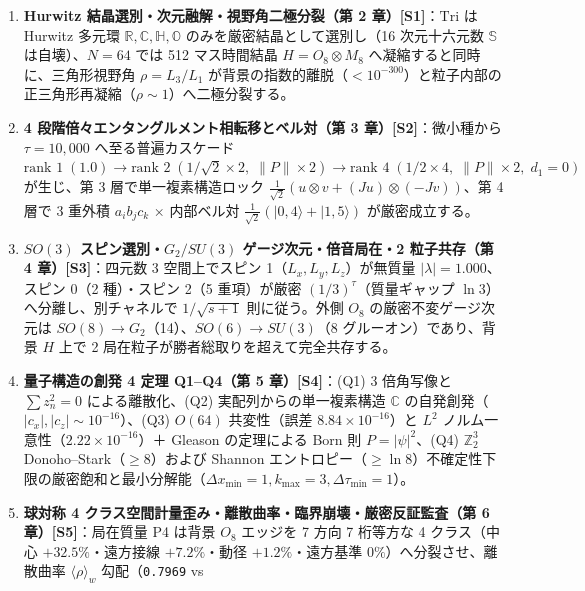 \documentclass[
  a4paper,
]{ltjsarticle}
\providecommand{\tightlist}{%
  \setlength{\itemsep}{0pt}\setlength{\parskip}{0pt}}
\begin{document}
\begin{enumerate}
\def\labelenumi{\arabic{enumi}.}
\tightlist
\item
  \textbf{Hurwitz 結晶選別・次元融解・視野角二極分裂（第 2
  章）{[}S1{]}}：\(\mathrm{Tri}\) は Hurwitz 多元環
  \(\mathbb{R}, \mathbb{C}, \mathbb{H}, \mathbb{O}\)
  のみを厳密結晶として選別し（16 次元十六元数 \(\mathbb{S}\)
  は自壊）、\(N = 64\) では 512 マス時間結晶 \(H = O_8 \otimes M_8\)
  へ凝縮すると同時に、三角形視野角 \(\rho = L_3/L_1\)
  が背景の指数的離脱（\(< 10^{-300}\)）と粒子内部の正三角形再凝縮（\(\rho \sim 1\)）へ二極分裂する。
\item
  \textbf{4 段階倍々エンタングルメント相転移とベル対（第 3
  章）{[}S2{]}}：微小種から \(\tau = 10{,}000\) へ至る普遍カスケード
  \(\text{rank } 1\;(1.0) \to \text{rank } 2\;(1/\sqrt{2}\times 2,\; \|P\|\times 2) \to \text{rank } 4\;(1/2\times 4,\; \|P\|\times 2,\; d_1=0)\)
  が生じ、第 3 層で単一複素構造ロック
  \(\frac{1}{\sqrt{2}}(u\otimes v + (Ju)\otimes(-Jv))\)、第 4 層で 3
  重外積 \(a_i b_j c_k\) × 内部ベル対
  \(\frac{1}{\sqrt{2}}(|0,4\rangle+|1,5\rangle)\) が厳密成立する。
\item
  \textbf{\(SO(3)\) スピン選別・\(G_2/SU(3)\) ゲージ次元・倍音局在・2
  粒子共存（第 4 章）{[}S3{]}}：四元数 3 空間上でスピン
  1（\(L_x,L_y,L_z\)）が無質量 \(|\lambda|=1.000\)、スピン 0（2
  種）・スピン 2（5 重項）が厳密 \((1/3)^\tau\)（質量ギャップ
  \(\ln 3\)）へ分離し、別チャネルで \(1/\sqrt{s+1}\) 則に従う。外側
  \(O_8\) の厳密不変ゲージ次元は
  \(SO(8) \to G_2\)（14）、\(SO(6) \to SU(3)\)（8
  グルーオン）であり、背景 \(H\) 上で 2
  局在粒子が勝者総取りを超えて完全共存する。
\item
  \textbf{量子構造の創発 4 定理 Q1--Q4（第 5 章）{[}S4{]}}：(Q1) 3
  倍角写像と \(\sum z_n^2 = 0\) による離散化、(Q2)
  実配列からの単一複素構造 \(\mathbb{C}\)
  の自発創発（\(|c_x|,|c_z| \sim 10^{-16}\)）、(Q3) \(O(64)\)
  共変性（誤差 \(8.84\times 10^{-16}\)）と \(L^2\)
  ノルム一意性（\(2.22\times 10^{-16}\)）＋ Gleason の定理による Born 則
  \(P = |\psi|^2\)、(Q4) \(\mathbb{Z}_2^3\)
  Donoho--Stark（\(\ge 8\)）および Shannon
  エントロピー（\(\ge \ln 8\)）不確定性下限の厳密飽和と最小分解能（\(\Delta x_{\min}=1, k_{\max}=3, \Delta\tau_{\min}=1\)）。
\item
  \textbf{球対称 4
  クラス空間計量歪み・離散曲率・臨界崩壊・厳密反証監査（第 6
  章）{[}S5{]}}：局在質量 P4 は背景 \(O_8\) エッジを 7 方向 7 桁等方な 4
  クラス（中心 \(+32.5\%\)・遠方接線 \(+7.2\%\)・動径
  \(+1.2\%\)・遠方基準 \(0\%\)）へ分裂させ、離散曲率
  \(\langle\rho\rangle_w\) 勾配（\texttt{0.7969} vs

\end{enumerate}
\end{document}
